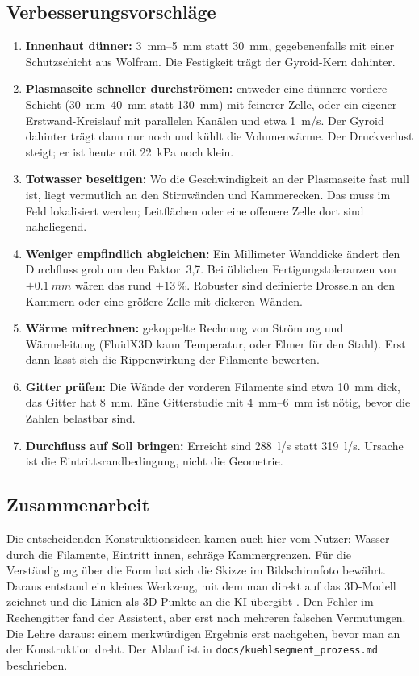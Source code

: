\documentclass[10pt,a4paper]{article}
\begin{document}
\subsection{Verbesserungsvorschläge}
\begin{enumerate}\itemsep1pt
\item \textbf{Innenhaut dünner:} \SIrange{3}{5}{mm} statt \SI{30}{mm}, gegebenenfalls mit einer Schutzschicht
  aus Wolfram. Die Festigkeit trägt der Gyroid-Kern dahinter.
\item \textbf{Plasmaseite schneller durchströmen:} entweder eine dünnere vordere Schicht (\SIrange{30}{40}{mm}
  statt \SI{130}{mm}) mit feinerer Zelle, oder ein eigener Erstwand-Kreislauf mit parallelen Kanälen und etwa
  \SI{1}{m/s}. Der Gyroid dahinter trägt dann nur noch und kühlt die Volumenwärme. Der Druckverlust steigt;
  er ist heute mit \SI{22}{kPa} noch klein.
\item \textbf{Totwasser beseitigen:} Wo die Geschwindigkeit an der Plasmaseite fast null ist, liegt
  vermutlich an den Stirnwänden und Kammerecken. Das muss im Feld lokalisiert werden; Leitflächen oder eine
  offenere Zelle dort sind naheliegend.
\item \textbf{Weniger empfindlich abgleichen:} Ein Millimeter Wanddicke ändert den Durchfluss grob um den
  Faktor~3,7. Bei üblichen Fertigungstoleranzen von $\pm\SI{0,1}{mm}$ wären das rund $\pm13\,\%$. Robuster sind
  definierte Drosseln an den Kammern oder eine größere Zelle mit dickeren Wänden.
\item \textbf{Wärme mitrechnen:} gekoppelte Rechnung von Strömung und Wärmeleitung (FluidX3D kann Temperatur,
  oder Elmer für den Stahl). Erst dann lässt sich die Rippenwirkung der Filamente bewerten.
\item \textbf{Gitter prüfen:} Die Wände der vorderen Filamente sind etwa \SI{10}{mm} dick, das Gitter hat
  \SI{8}{mm}. Eine Gitterstudie mit \SIrange{4}{6}{mm} ist nötig, bevor die Zahlen belastbar sind.
\item \textbf{Durchfluss auf Soll bringen:} Erreicht sind \SI{288}{l/s} statt \SI{319}{l/s}. Ursache ist die
  Eintrittsrandbedingung, nicht die Geometrie.
\end{enumerate}

\subsection{Zusammenarbeit}
Die entscheidenden Konstruktionsideen kamen auch hier vom Nutzer: Wasser durch die Filamente, Eintritt innen,
schräge Kammergrenzen. Für die Verständigung über die Form hat sich die Skizze im Bildschirmfoto bewährt. Daraus
entstand ein kleines Werkzeug, mit dem man direkt auf das 3D-Modell zeichnet und die Linien als 3D-Punkte an die
KI übergibt \cite{sketch}. Den Fehler im Rechengitter fand der Assistent, aber erst nach mehreren falschen
Vermutungen. Die Lehre daraus: einem merkwürdigen Ergebnis erst nachgehen, bevor man an der Konstruktion
dreht. Der Ablauf ist in \texttt{docs/kuehlsegment\_prozess.md} beschrieben.
\end{document}
